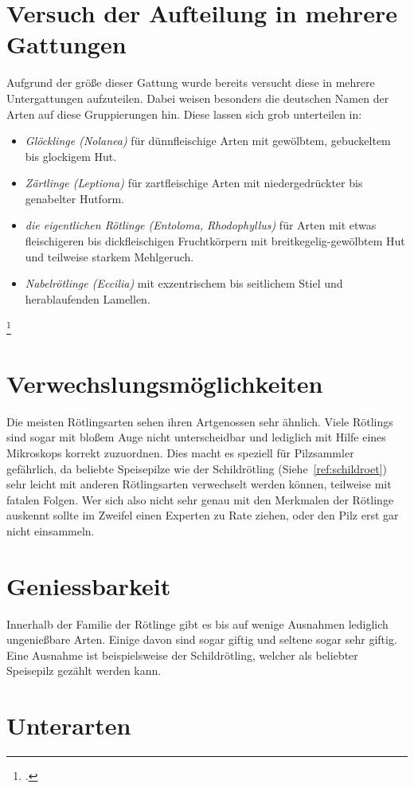 \documentclass[a4paper,abstracton]{scrreprt}
\begin{document}
\section{Versuch der Aufteilung in mehrere Gattungen}
Aufgrund der größe dieser Gattung wurde bereits versucht diese in mehrere Untergattungen aufzuteilen. Dabei weisen besonders die deutschen Namen der Arten auf diese Gruppierungen hin. Diese lassen sich grob unterteilen in:
\begin{itemize}
\item \emph{Glöcklinge (Nolanea)} für dünnfleischige Arten mit gewölbtem, gebuckeltem bis glockigem Hut.
\item \emph{Zärtlinge (Leptiona)} für zartfleischige Arten mit niedergedrückter bis genabelter Hutform.
\item \emph{die eigentlichen Rötlinge (Entoloma, Rhodophyllus)} für Arten mit etwas fleischigeren bis dickfleischigen Fruchtkörpern mit breitkegelig-gewölbtem Hut und teilweise starkem Mehlgeruch.
\item \emph{Nabelrötlinge (Eccilia)} mit exzentrischem bis seitlichem Stiel und herablaufenden Lamellen.
\end{itemize}
\footcite{beschreibung}

\section{Verwechslungsmöglichkeiten}
Die meisten Rötlingsarten sehen ihren Artgenossen sehr ähnlich. Viele Rötlings sind sogar mit bloßem Auge nicht unterscheidbar und lediglich mit Hilfe eines Mikroskops korrekt zuzuordnen. Dies macht es speziell für Pilzsammler gefährlich, da beliebte Speisepilze wie der Schildrötling (Siehe~\ref{ref:schildroet}) sehr leicht mit anderen Rötlingsarten verwechselt werden können, teilweise mit fatalen Folgen. Wer sich also nicht sehr genau mit den Merkmalen der Rötlinge auskennt sollte im Zweifel einen Experten zu Rate ziehen, oder den Pilz erst gar nicht einsammeln.
\section{Geniessbarkeit}
Innerhalb der Familie der Rötlinge gibt es bis auf wenige Ausnahmen lediglich ungenießbare Arten. Einige davon sind sogar giftig und seltene sogar sehr giftig. Eine Ausnahme ist beispielsweise der Schildrötling, welcher als beliebter Speisepilz gezählt werden kann. 
\section{Unterarten}
\end{document}
